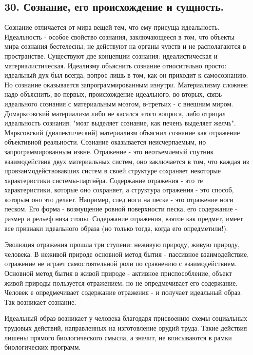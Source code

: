 \documentclass[a4paper, 12pt]{article}
\begin{document}
\subsection*{\textbf{30. Сознание, его происхождение и сущность.}}

Сознание отличается от мира вещей тем, что ему присуща идеальность.
Идеальность - особое свойство сознания, заключающееся в том, что объекты мира сознания бестелесны, не действуют на органы чувств и не располагаются в пространстве.
Существуют две концепции сознания: идеалистическая и материалистическая.
Идеализму объяснить сознание относительно просто: идеальный дух был всегда, вопрос лишь в том, как он приходит к самосознанию.
Но сознание оказывается запрограммированным изнутри.
Материализму сложнее: надо объяснить, во-первых, происхождение идеального, во-вторых, связь идеального сознания с материальным мозгом, в-третьих - с внешним миром.
Домарксовский материализм либо не касался этого вопроса, либо отрицал идеальность сознания: "мозг выделяет сознание, как печень выделяет желчь".
Марксовский (диалектический) материализм объяснил сознание как отражение объективной реальности.
Сознание оказывается неисчерпаемым, но запрограммированным извне.
Отражение - это неотъемлемый спутник взаимодействия двух материальных систем, оно заключается в том, что каждая из провзаимодействовавших систем в своей структуре сохраняет некоторые характеристики системы-партнёра.
Содержание отражения - это те характеристики, которые оно сохраняет, а структура отражения - это способ, которым оно это делает.
Например, след ноги на песке - это отражение ноги песком.
Его форма - возмущение ровной поверхности песка, его содержание - размер и рельеф низа стопы.
Содержание отражения, взятое как предмет, имеет все признаки идеального образа (но только тогда, когда его опредметили!).

Эволюция отражения прошла три ступени: неживую природу, живую природу, человека.
В неживой природе основной метод бытия - пассивное взаимодействие, отражение не играет самостоятельной роли по сравнению с взаимодействием.
Основной метод бытия в живой природе - активное приспособление, объект живой природы пользуется отражением, но не опредмечивает его содержание.
Человек е опредмечивает содержание отражения - и получает идеальный образ.
Так возникает сознание.

Идеальный образ возникает у человека благодаря присвоению схемы социальных трудовых действий, направленных на изготовление орудий труда.
Такие действия лишены прямого биологического смысла, а значит, не вписываются в рамки биологических программ.
\end{document}
